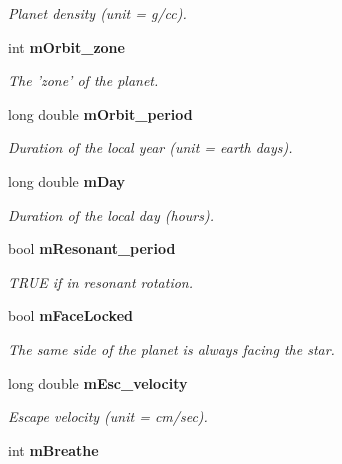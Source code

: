 \begin{CompactItemize}
\begin{CompactList}\small\item\em Planet density (unit = g/cc). \item\end{CompactList}\item 
int {\bf m\-Orbit\_\-zone}\label{class_s_g___planet_p14}

\begin{CompactList}\small\item\em The 'zone' of the planet. \item\end{CompactList}\item 
long double {\bf m\-Orbit\_\-period}\label{class_s_g___planet_p15}

\begin{CompactList}\small\item\em Duration of the local year (unit = earth days). \item\end{CompactList}\item 
long double {\bf m\-Day}\label{class_s_g___planet_p16}

\begin{CompactList}\small\item\em Duration of the local day (hours). \item\end{CompactList}\item 
bool {\bf m\-Resonant\_\-period}\label{class_s_g___planet_p17}

\begin{CompactList}\small\item\em TRUE if in resonant rotation. \item\end{CompactList}\item 
bool {\bf m\-Face\-Locked}\label{class_s_g___planet_p18}

\begin{CompactList}\small\item\em The same side of the planet is always facing the star. \item\end{CompactList}\item 
long double {\bf m\-Esc\_\-velocity}\label{class_s_g___planet_p19}

\begin{CompactList}\small\item\em Escape velocity (unit = cm/sec). \item\end{CompactList}\item 
int {\bf m\-Breathe}\label{class_s_g___planet_p20}


\end{CompactItemize}
